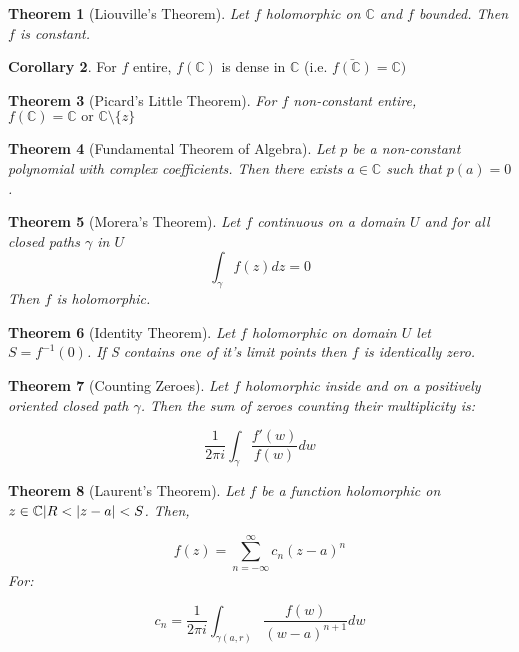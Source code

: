 \documentclass[11pt,a4paper, titlepage]{article}
\newtheorem{theorem}{Theorem}[section]
\DeclarePairedDelimiter\abs{\lvert}{\rvert}
\theoremstyle{definition}
\newtheorem{corollary}[theorem]{Corollary}
\begin{document}
\begin{theorem}[Liouville's Theorem]
Let $f$ holomorphic on $\mathbb{C}$ and $f$ bounded. Then $f$ is constant.
\end{theorem}

\begin{corollary}
For $f$ entire, $f(\mathbb{C})$ is dense in $\mathbb{C}$ (i.e. $\bar{f(\mathbb{C})} = \mathbb{C})$
\end{corollary}

\begin{theorem}[Picard's Little Theorem]
For $f$ non-constant entire, $f(\mathbb{C}) = \mathbb{C} \textrm{ or } \mathbb{C} \setminus \{z\} $
\end{theorem}

\begin{theorem}[Fundamental Theorem of Algebra]

Let $p$ be a non-constant polynomial with complex coefficients. Then there exists $a \in \mathbb{C}$ such that $p(a) = 0$.

\end{theorem}

\begin{theorem}[Morera's Theorem]
Let $f$ continuous on a domain $U$ and for all closed paths $\gamma$ in $U$
\[
	\int_\gamma f(z) dz = 0
\]
Then $f$ is holomorphic.


\end{theorem}


\begin{theorem}[Identity Theorem]
Let $f$ holomorphic on domain $U$ let $S = f^{-1}({0})$. If S contains one of it's limit points then $f$ is identically zero.
\end{theorem}

\begin{theorem}[Counting Zeroes]

Let $f$ holomorphic inside and on a positively oriented closed path $\gamma$. Then the sum of zeroes counting their multiplicity is:

\[
	\frac{1}{2 \pi i} \int_\gamma \frac{f'(w)}{f(w)}dw 
\]


\end{theorem}

\begin{theorem}[Laurent's Theorem]

Let $f$ be a function holomorphic on ${ z \in  \mathbb{C} | R < \abs{z - a} < S}$. Then, 

\[
 	f(z) = \sum_{n = -\infty}^{\infty} c_n (z-a)^n
 \] 
For:

\[
	c_n = \frac{1}{2 \pi i} \int_{\gamma(a,r)} \frac{f(w)}{(w-a)^{n+1}}dw
\]
\end{theorem}
\end{document}
